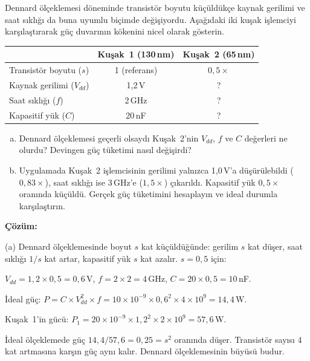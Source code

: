 \begin{ornek}[1.6]
\label{orn:dennard-guc-duvari}
Dennard ölçeklemesi döneminde transistör boyutu küçüldükçe kaynak gerilimi ve saat sıklığı da buna uyumlu biçimde değişiyordu. Aşağıdaki iki kuşak işlemciyi karşılaştırarak güç duvarının kökenini nicel olarak gösterin.

\begin{center}
\small
\begin{tabular}{lcc}
\toprule
& \textbf{Kuşak~1 (130\,nm)} & \textbf{Kuşak~2 (65\,nm)} \\
\midrule
Transistör boyutu ($s$)  & 1 (referans) & $0{,}5\times$ \\
Kaynak gerilimi ($V_{dd}$) & 1{,}2\,V & ? \\
Saat sıklığı ($f$) & 2\,GHz & ? \\
Kapasitif yük ($C$) & 20\,nF & ? \\
\bottomrule
\end{tabular}
\end{center}

\begin{enumerate}[(a)]
\item Dennard ölçeklemesi geçerli olsaydı Kuşak~2'nin $V_{dd}$, $f$ ve $C$ değerleri ne olurdu? Devingen güç tüketimi nasıl değişirdi?
\item Uygulamada Kuşak~2 işlemcisinin gerilimi yalnızca 1{,}0\,V'a düşürülebildi ($0{,}83\times$), saat sıklığı ise 3\,GHz'e ($1{,}5\times$) çıkarıldı. Kapasitif yük $0{,}5\times$ oranında küçüldü. Gerçek güç tüketimini hesaplayın ve ideal durumla karşılaştırın.
\end{enumerate}

\textbf{Çözüm:}

(a) Dennard ölçeklemesinde boyut $s$ kat küçüldüğünde: gerilim $s$ kat düşer, saat sıklığı $1/s$ kat artar, kapasitif yük $s$ kat azalır. $s = 0{,}5$ için:

$V_{dd} = 1{,}2 \times 0{,}5 = 0{,}6$\,V, \quad $f = 2 \times 2 = 4$\,GHz, \quad $C = 20 \times 0{,}5 = 10$\,nF.

İdeal güç: $P = C \times V_{dd}^2 \times f = 10 \times 10^{-9} \times 0{,}6^2 \times 4 \times 10^{9} = 14{,}4$\,W.

Kuşak~1'in gücü: $P_1 = 20 \times 10^{-9} \times 1{,}2^2 \times 2 \times 10^{9} = 57{,}6$\,W.

İdeal ölçeklemede güç $14{,}4 / 57{,}6 = 0{,}25 = s^2$ oranında düşer. Transistör sayısı 4 kat artmasına karşın güç aynı kalır. Dennard ölçeklemesinin büyüsü budur.


\end{ornek}
